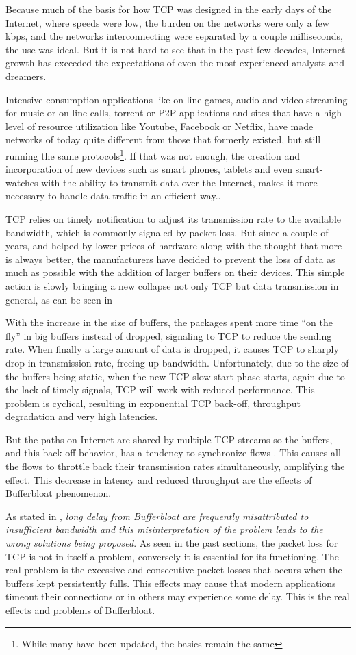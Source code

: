 Because much of the basis for how TCP was designed in the early days of the
Internet, where speeds were low, the burden on the networks were only a few
kbps, and the networks interconnecting were separated by a couple
milliseconds, the use was ideal. But it is not hard to see that in the past
few decades, Internet growth has exceeded the expectations of even the most
experienced analysts and dreamers.

Intensive-consumption applications like on-line games, audio and video
streaming for music or on-line calls, torrent or P2P applications and 
sites that have a high level of resource utilization like Youtube, Facebook or
Netflix, have made networks of today quite different from those that formerly
existed, but still running the same protocols\footnote{While many have been
updated, the basics remain the same}. If that was not enough, the creation and
incorporation of new devices such as smart phones, tablets and even smart-watches
with the ability to transmit data over the Internet, makes it more necessary to handle data traffic in an efficient way..

TCP relies on timely notification to adjust its transmission rate to the
available bandwidth, which is commonly signaled by packet loss. But since a
couple of years, and helped by lower prices of hardware along
with the thought that more is always better, the manufacturers have decided to
prevent the loss of data as much as possible with the addition of larger buffers on
their devices. This simple action is slowly bringing a new collapse not only
TCP but data transmission in general, as can be seen in \cite{CACMStaff}

With the increase in the size of buffers, the packages spent more time
``on the fly'' in big buffers instead of dropped, signaling to TCP to
reduce the sending rate. When finally a large amount of data is dropped,
it causes TCP to
sharply drop in transmission rate, freeing up bandwidth. Unfortunately, due to
the size of the buffers being static, when the new TCP slow-start phase starts,
again due to the lack of timely signals, TCP will work with reduced
performance. This problem is cyclical, resulting in exponential TCP back-off,
throughput degradation and very high latencies.

But the paths on Internet are shared by multiple TCP streams so the buffers,
and this back-off behavior, has a tendency to synchronize flows
\cite{main:ref:1}. This causes all the flows to throttle back their
transmission rates simultaneously, amplifying the effect. This decrease in
latency and reduced throughput are the effects of Bufferbloat phenomenon.

As stated in \cite{GettysNichols}, \emph{long delay from Bufferbloat are
frequently misattributed to insufficient bandwidth and this misinterpretation
of the problem leads to the wrong solutions being proposed}. As seen in the
past sections, the packet loss for TCP is not in itself a problem, conversely
it is essential for its functioning. The real problem is  the excessive and
consecutive packet losses that occurs when the buffers kept persistently
fulls. This effects may cause that modern applications timeout their
connections or in others may experience some delay. This is the real
effects and problems of Bufferbloat.
